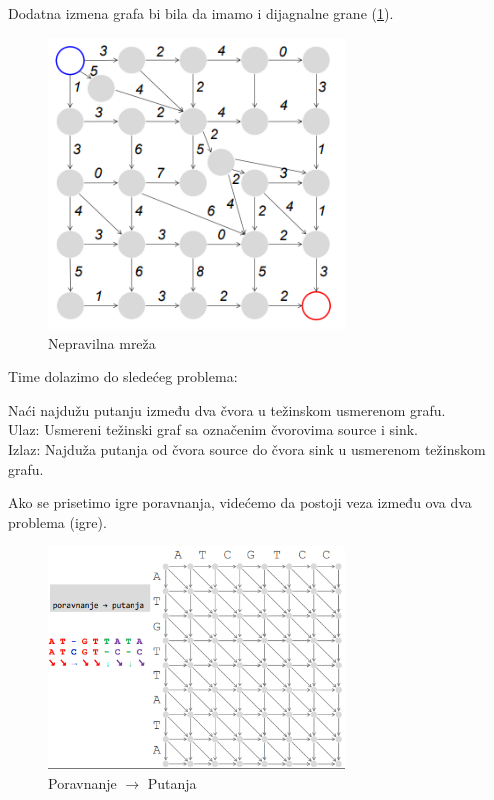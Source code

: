 \noindent Dodatna izmena grafa bi bila da imamo i dijagnalne grane (\ref{slika:menhetn3}).

\begin{figure}[h!]
\centering
\includegraphics[width=0.7\textwidth]{poglavlja/5/slike/menhetn3.png}
\caption{Nepravilna mreža}
\label{slika:menhetn3}
\end{figure}

\noindent Time dolazimo do sledećeg problema:

\begin{problem}
	Naći najdužu putanju između dva   čvora u težinskom usmerenom grafu. \\
	Ulaz: Usmereni težinski graf sa označenim
čvorovima source i sink. \\
	Izlaz: Najduža putanja od čvora source do čvora
sink u usmerenom težinskom grafu. 
\end{problem}

Ako se prisetimo igre poravnanja, videćemo da postoji veza između ova dva problema (igre).

\begin{figure}[h!]
\centering
\includegraphics[width=0.7\textwidth]{poglavlja/5/slike/menhetn4.png}
\caption{Poravnanje $\rightarrow$ Putanja}
\label{slika:menhetn4}
\end{figure}

